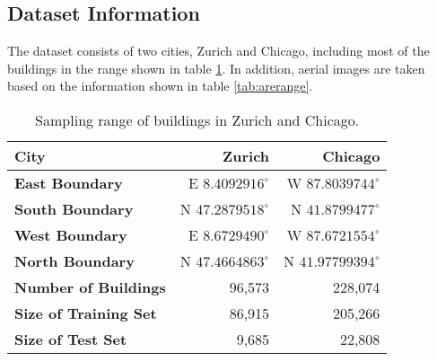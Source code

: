 \subsection{Dataset Information}\label{datainfo}

The dataset consists of two cities, Zurich and Chicago, including most of the buildings in the range shown in table \ref{tab:bldrange}. In addition, aerial images are taken based on the information shown in table \ref{tab:arerange}.

\begin{table}[!h]
	\centering
	\caption[Sampling range of buildings in Zurich and Chicago]{Sampling range of buildings in Zurich and Chicago.}
	\label{tab:bldrange}
	\begin{tabular}{l|r|r}
	\hline
	\textbf{City} & Zurich & Chicago \\ \hline
	\textbf{East Boundary} & E $8.4092916^\circ$ & W $87.8039744^\circ$ \\
	\textbf{South Boundary} & N $47.2879518^\circ$ & N $41.8799477^\circ$ \\
	\textbf{West Boundary} & E $8.6729490^\circ$ & W $87.6721554^\circ$ \\
	\textbf{North Boundary} & N $47.4664863^\circ$ & N $41.97799394^\circ$ \\
	\hline
	\textbf{Number of Buildings} & 96,573 & 228,074 \\
	\textbf{Size of Training Set} & 86,915 & 205,266 \\
	\textbf{Size of Test Set} & 9,685 & 22,808 \\
	\hline
	\end{tabular}
\end{table}
